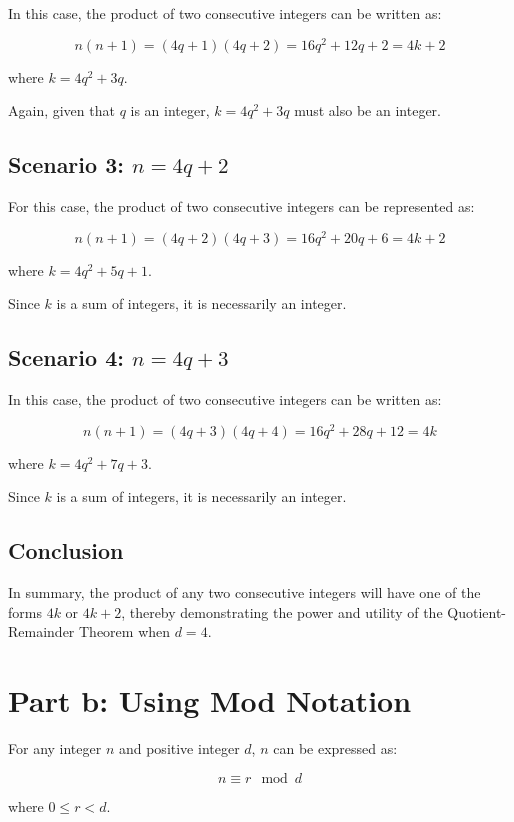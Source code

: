 \documentclass[12pt]{article}
\begin{document}
In this case, the product of two consecutive integers can be written as:

\[
n(n + 1) = (4q + 1)(4q + 2) = 16q^2 + 12q + 2 = 4k + 2
\]

where \( k = 4q^2 + 3q \).

Again, given that \( q \) is an integer, \( k = 4q^2 + 3q \) must also be an integer.

\subsection{Scenario 3: \( n = 4q + 2 \)}

For this case, the product of two consecutive integers can be represented as:

\[
n(n + 1) = (4q + 2)(4q + 3) = 16q^2 + 20q + 6 = 4k + 2
\]

where \( k = 4q^2 + 5q + 1 \).

Since \( k \) is a sum of integers, it is necessarily an integer.

\subsection{Scenario 4: \( n = 4q + 3 \)}

In this case, the product of two consecutive integers can be written as:

\[
n(n + 1) = (4q + 3)(4q + 4) = 16q^2 + 28q + 12 = 4k
\]

where \( k = 4q^2 + 7q + 3 \).

Since \( k \) is a sum of integers, it is necessarily an integer.

\subsection{Conclusion}

In summary, the product of any two consecutive integers will have one of the forms \( 4k \) or \( 4k + 2 \), thereby demonstrating the power and utility of the Quotient-Remainder Theorem when \( d = 4 \).

\section{Part b: Using Mod Notation}
For any integer \( n \) and positive integer \( d \), \( n \) can be expressed as:

\[
n \equiv r \mod{d}
\]

where \( 0 \leq r < d \).
\end{document}
